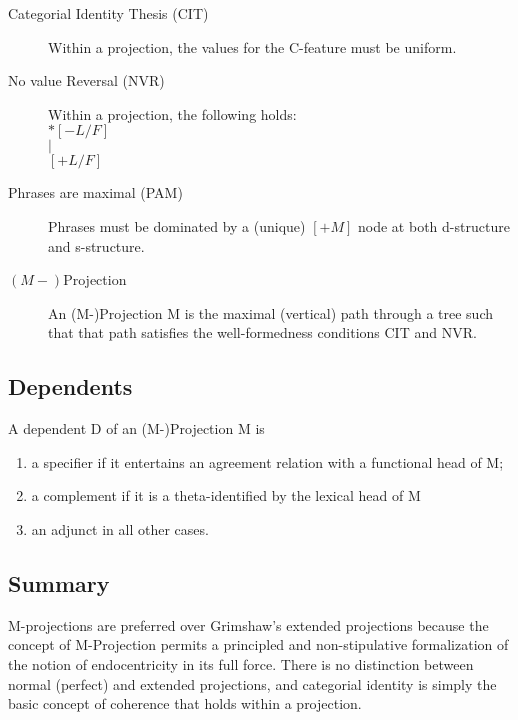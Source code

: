 \documentclass{article}
\begin{document}
\begin{example}
\begin{description}
\item [Categorial Identity Thesis (CIT)] 
Within a projection, the values for the C-feature must be uniform.
\end{description}
\end{example}
\begin{example}
\begin{description}
\item[No value Reversal (NVR)]
Within a projection, the following holds:\\
$*[-L/F]$ \\
       $|$ \\
 $[+L/F]$
\end{description}
\end {example}
\begin{example}
\begin{description}
\item [Phrases are maximal (PAM)]
Phrases must be dominated by a (unique) $[+M]$ node at both d-structure and s-structure.
\end{description}
\end{example}
\begin{example}
\begin{description}
\item [$(M-)$Projection]
An (M-)Projection M is the maximal (vertical) path through a tree such that that path satisfies the well-formedness conditions CIT and NVR.
\end{description}
\end{example}

\subsection{Dependents}
\begin{example}
A dependent D of an (M-)Projection M is
\begin{enumerate}
\item a specifier if it entertains an agreement relation with a functional head of M;
\item a complement if it is a theta-identified by the lexical head of M
\item an adjunct in all other cases.
\end{enumerate}
\end{example}

\subsection{Summary}
M-projections are preferred over Grimshaw's extended projections because the concept of M-Projection permits a principled and non-stipulative formalization of the notion of endocentricity in its full force. There is no distinction between normal (perfect) and extended projections, and categorial identity is simply the basic concept of coherence that holds within a projection. 
\end{document}
